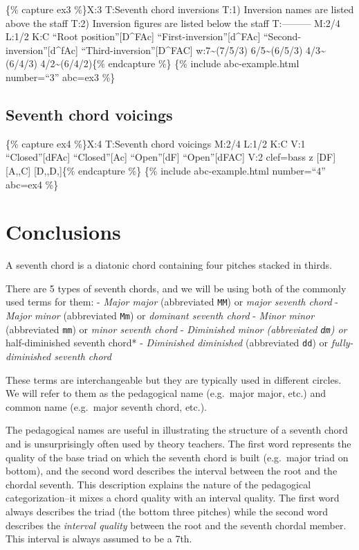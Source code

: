 \documentclass{book}
\begin{document}
\{\% capture ex3 \%\}X:3 T:Seventh chord inversions T:1) Inversion names are
listed above the staff T:2) Inversion figures are listed below the staff
T:--------- M:2/4 L:1/2 K:C ``Root position''{[}D\^{}FAc{]}\textbar{}
``First-inversion''{[}d\^{}FAc{]}\textbar{}
``Second-inversion''{[}d\^{}fAc{]}\textbar{}
``Third-inversion''{[}D\^{}FAC{]}\textbar\textbar{} w:7\textasciitilde(7/5/3)
6/5\textasciitilde(6/5/3) 4/3\textasciitilde(6/4/3)
4/2\textasciitilde(6/4/2)\{\% endcapture \%\} \{\% include abc-example.html
number=``3'' abc=ex3 \%\}

\hypertarget{seventh-chord-voicings}{%
\subsection{Seventh chord voicings}\label{seventh-chord-voicings}}

\{\% capture ex4 \%\}X:4 T:Seventh chord voicings M:2/4 L:1/2 K:C V:1
``Closed''{[}dFAc{]}\textbar{} ``Closed''{[}Ac{]}\textbar{}
``Open''{[}dF{]}\textbar{} ``Open''{[}dFAC{]}\textbar{} V:2 clef=bass
z\textbar{} {[}DF{]}\textbar{} {[}A,,C{]}\textbar{} {[}D,,D,{]}\textbar\{\%
endcapture \%\} \{\% include abc-example.html number=``4'' abc=ex4 \%\}

\hypertarget{conclusions-26}{%
\section{Conclusions}\label{conclusions-26}}

A seventh chord is a diatonic chord containing four pitches stacked in thirds.

There are 5 types of seventh chords, and we will be using both of the commonly
used terms for them: - \emph{Major major} (abbreviated \texttt{MM}) or
\emph{major seventh chord} - \emph{Major minor} (abbreviated \texttt{Mm}) or
\emph{dominant seventh chord} - \emph{Minor minor} (abbreviated \texttt{mm})
or \emph{minor seventh chord} - \emph{Diminished minor (abbreviated
\texttt{dm}) or }half-diminished seventh chord* - \emph{Diminished diminished}
(abbreviated \texttt{dd}) or \emph{fully-diminished seventh chord}

These terms are interchangeable but they are typically used in different
circles. We will refer to them as the pedagogical name (e.g.~major major,
etc.) and common name (e.g.~major seventh chord, etc.).

The pedagogical names are useful in illustrating the structure of a seventh
chord and is unsurprisingly often used by theory teachers. The first word
represents the quality of the base triad on which the seventh chord is built
(e.g.~major triad on bottom), and the second word describes the interval
between the root and the chordal seventh. This description explains the nature
of the pedagogical categorization--it mixes a chord quality with an interval
quality. The first word always describes the triad (the bottom three pitches)
while the second word describes the \emph{interval quality} between the root
and the seventh chordal member. This interval is always assumed to be a 7th.
\end{document}
